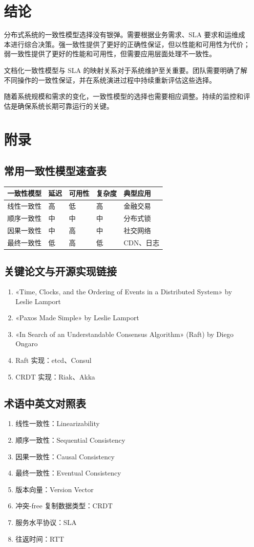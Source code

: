 \chapter{结论}
分布式系统的一致性模型选择没有银弹。需要根据业务需求、SLA 要求和运维成本进行综合决策。强一致性提供了更好的正确性保证，但以性能和可用性为代价；弱一致性提供了更好的性能和可用性，但需要应用层面处理不一致性。\par
文档化一致性模型与 SLA 的映射关系对于系统维护至关重要。团队需要明确了解不同操作的一致性保证，并在系统演进过程中持续重新评估这些选择。\par
随着系统规模和需求的变化，一致性模型的选择也需要相应调整。持续的监控和评估是确保系统长期可靠运行的关键。\par
\chapter{附录}
\section{常用一致性模型速查表}
\begin{table}[H]
\centering
\begin{tabular}{|l|l|l|l|l|}
\hline
一致性模型 & 延迟 & 可用性 & 复杂度 & 典型应用 \\
\hline
线性一致性 & 高 & 低 & 高 & 金融交易 \\
\hline
顺序一致性 & 中 & 中 & 中 & 分布式锁 \\
\hline
因果一致性 & 中 & 高 & 中 & 社交网络 \\
\hline
最终一致性 & 低 & 高 & 低 & CDN、日志 \\
\hline
\end{tabular}
\end{table}
\section{关键论文与开源实现链接}
\begin{enumerate}
\item «Time, Clocks, and the Ordering of Events in a Distributed System» by Leslie Lamport
\item «Paxos Made Simple» by Leslie Lamport
\item «In Search of an Understandable Consensus Algorithm» (Raft) by Diego Ongaro
\item Raft 实现：etcd、Consul
\item CRDT 实现：Riak、Akka
\end{enumerate}
\section{术语中英文对照表}
\begin{enumerate}
\item 线性一致性：Linearizability
\item 顺序一致性：Sequential Consistency
\item 因果一致性：Causal Consistency
\item 最终一致性：Eventual Consistency
\item 版本向量：Version Vector
\item 冲突-free 复制数据类型：CRDT
\item 服务水平协议：SLA
\item 往返时间：RTT
\end{enumerate}
